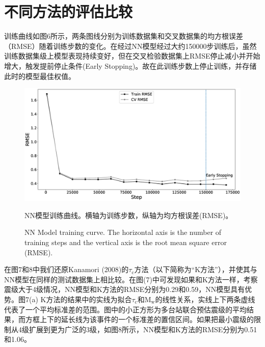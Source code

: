 \section{不同方法的评估比较}
\indent 训练曲线如图6所示，两条图线分别为训练数据集和交叉数据集的均方根误差（RMSE）随着训练步数的变化。在经过NN模型经过大约150000步训练后，虽然训练数据集级上模型表现持续变好，但在交叉检验数据集上RMSE停止减小并开始增大，触发提前停止条件(Early Stopping)。故在此训练步数上停止训练，并存储此时的模型最佳权值。\\
\begin{figure}[!h] 
\centering 
 \includegraphics[width=0.8\linewidth]{img/6.eps} 
 \renewcommand{\figurename}{图} 
\caption{NN模型训练曲线。横轴为训练步数，纵轴为均方根误差(RMSE)。} 
\addtocounter{figure}{-1} \vspace{-5pt} 
\renewcommand{\figurename}{Fig} 
\caption{NN Model training curve. The horizontal axis is the number of training steps and the vertical axis is the root mean square error (RMSE).} 
\renewcommand{\figurename}{图} 
\label{fig:network-device-influence.png} 
\end{figure}
\indent 在图7和8中我们还原Kanamori (2008)的$\tau_{\mathrm{c}}$方法（以下简称为“K方法”），并使其与NN模型在同样的测试数据集上相比较。在图(7)中可发现如果和K方法一样，考察震级大于4级情况，NN模型和K方法的RMSE分别为0.29和0.59，NN模型具有优势。图7(a) K方法的结果中的实线为拟合$\tau_{\mathrm{c}}$和$\mathrm{M}_{\mathrm{w}}$的线性关系，实线上下两条虚线代表了一个平均标准差的范围。图中的小正方形为多台站联合预估震级的平均结果，而方框上下的延长线为该事件的一个标准差的置信区间。如果把最小震级的限制从4级扩展到更为广泛的3级，如图8所示，NN模型和K方法的RMSE分别为0.51和1.06。\\
